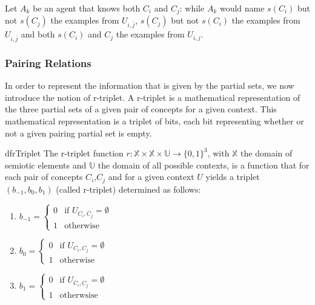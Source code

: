 Let $A_{k}$ be an agent that knows both $C_{i}$ and $C_{j}$: while $A_{k}$ would name $s(C_{i})$ but not $s(C_{j})$ the examples from $U_{i,\overbar{j}}$, $s(C_{j})$ but not $s(C_{i})$ the examples from $U_{i,\overbar{j}}$ and both $s(C_{i})$ and $C_{j}$ the examples from $U_{i,j}$.

\subsubsection{Pairing Relations}\label{sec:Relations}

In order to represent the information that is given by the partial sets, we now introduce the notion of r-triplet. A r-triplet is a mathematical representation of the three partial sets of a given pair of concepts for a given context. This mathematical representation is a triplet of bits, each bit representing whether or not a given pairing partial set is empty. 

\begin{restatable}{df}{rTriplet}
\label{def:RTriplet}
The r-triplet function $r: \mathbb{X} \times \mathbb{X} \times \mathbb{U} \rightarrow  \{0, 1\}^{3}$, with $\mathbb{X}$ the domain of semiotic elements and $\mathbb{U}$ the domain of all possible contexts, is a function that for each pair of concepts $C_{i}$,$C_{j}$ and for a given context $U$ yields a triplet $(b_{-1},b_{0},b_{1})$ (called r-triplet) determined as follows:

\begin{enumerate}
\item $b_{-1} = \left\{
	\begin{array}{ll}
		0  & \mbox{if } U_{C_i,\overbar{C}_j} = \emptyset \\
		1 & \mbox{otherwise}
	\end{array}
\right.$
\item $b_{0} = \left\{
	\begin{array}{ll}
		0  & \mbox{if } U_{C_i,C_j} = \emptyset \\
		1 & \mbox{otherwise}
	\end{array}
\right.$
\item $b_{1} = \left\{
	\begin{array}{ll}
		0  & \mbox{if } U_{\overbar{C}_i,C_j} = \emptyset \\
		1 & \mbox{otherwsise}
	\end{array}
\right.$
\end{enumerate}
\end{restatable}

